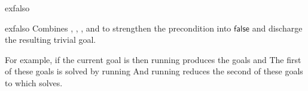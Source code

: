 \begin{tactic}{exfalso}
  \begin{tsyntax}{exfalso}
  Combines , , ,
   and  to strengthen the precondition
  into $\mathsf{false}$ and discharge the resulting trivial goal.

  For example, if the current goal is
   then
  running 
  produces the goals
  and
  The first of these goals is solved by
  running 
  And running 
  reduces the second of these goals to
  which  solves.
  \end{tsyntax}

\end{tactic}

